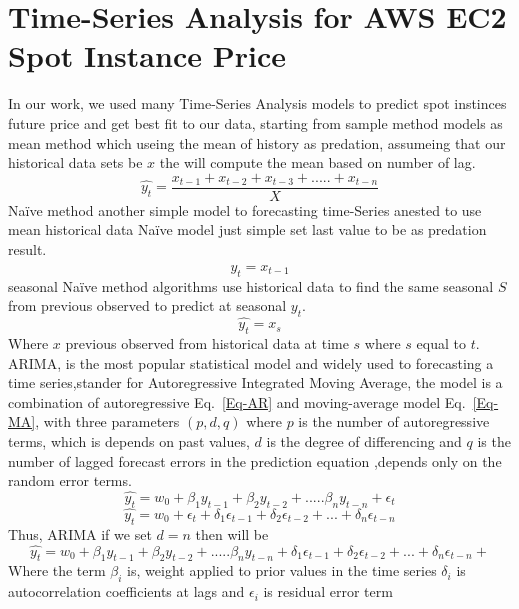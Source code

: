 \documentclass[graybox]{svmult}
\begin{document}
\section{Time-Series Analysis for AWS EC2 Spot Instance Price}
In our work, we used many Time-Series Analysis models to predict spot instinces future price and get best fit to our data, starting from sample method models as mean method which useing the mean of history as predation, assumeing that our historical data sets be \(x\) the will compute the mean based on number of lag.
\begin{equation}
\hat{y_t} = \frac{x_{t-1} +x_{t-2}+ x_{t-3}+.....+x_{t-n}}{X}
\label{mean}
\end{equation} 
Naïve method another simple model to forecasting time-Series anested to use mean historical data Naïve model just simple set last value to be as predation result. 
\begin{equation}
\hat{y_t} = x_{t-1} 
\label{naive}
\end{equation}
seasonal Naïve method algorithms use historical data to find the same seasonal \(S\) from previous observed to predict at seasonal \(y_t\). 
\begin{equation}
\hat{y_t} = x_s 
\label{smean}
\end{equation}
Where \(x\) previous observed from historical data at time \(s\) where \(s\) equal to \(t\).\\
ARIMA, is the most popular statistical model and widely used to forecasting a time series,stander for Autoregressive Integrated Moving Average, the model is a combination of  autoregressive Eq.~\ref{Eq-AR} and moving-average model Eq.~\ref{Eq-MA}, with three parameters  \((p,d,q)\) where \(p\) is the number of autoregressive terms, which is depends on past values, \(d\) is the degree of differencing and  \(q\) is the number of lagged forecast errors in the prediction equation ,depends only on the random error terms.
\begin{equation}
\hat{y_t} = w_0 +\beta_1 y_{t-1}+ \beta_2 y_{t-2}+.....\beta_n y_{t-n}+\epsilon_t
\label{Eq-AR}
\end{equation}
\begin{equation}
\hat{y_t} = w_0 +\epsilon_t + \delta_1 \epsilon_{t-1}+  \delta_2 \epsilon_{t-2}+...+ \delta_n \epsilon_{t-n}
\label{Eq-MA}
\end{equation}
Thus, ARIMA if we set \(d = n\) then will be 
\begin{equation}
\hat{y_t} = w_0 +\beta_1 y_{t-1}+ \beta_2 y_{t-2}+.....\beta_n y_{t-n} +  \delta_1 \epsilon_{t-1}+  \delta_2 \epsilon_{t-2}+...+ \delta_n \epsilon_{t-n}+
\label{Eq-ARIMA}
\end{equation}
Where the term \(\beta_i \) is, weight applied to prior values in the time series \(\delta_i \) is autocorrelation coefficients at lags and \(\epsilon_i \) is residual error term\\
\end{document}
